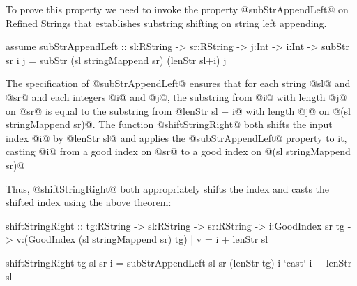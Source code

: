 %
To prove this property we need to invoke the property
@subStrAppendLeft@ on Refined Strings that establishes
substring shifting on string left appending.
%
\begin{code}
  assume subStrAppendLeft
    :: sl:RString -> sr:RString
    -> j:Int -> i:Int
    -> {subStr sr i j = subStr (sl stringMappend sr) (lenStr sl+i) j}
\end{code}
%
The specification of @subStrAppendLeft@ ensures that for each
string @sl@ and @sr@ and each integers @i@ and @j@,
the substring from @i@ with length @j@ on @sr@
is equal to the substring from @lenStr sl + i@
with length @j@ on @(sl stringMappend sr)@.
%
The function @shiftStringRight@ both shifts the input index @i@ by @lenStr sl@
and applies the @subStrAppendLeft@ property to it,
casting @i@ from a good index on @sr@ to a good index on @(sl stringMappend sr)@

Thus, @shiftStringRight@ both appropriately shifts the index
and casts the shifted index using the above theorem:
\begin{code}
  shiftStringRight
    :: tg:RString -> sl:RString -> sr:RString
    -> i:GoodIndex sr tg
    -> {v:(GoodIndex (sl stringMappend sr) tg) | v = i + lenStr sl}
    
  shiftStringRight tg sl sr i
    = subStrAppendLeft sl sr (lenStr tg) i `cast` i + lenStr sl
\end{code}

